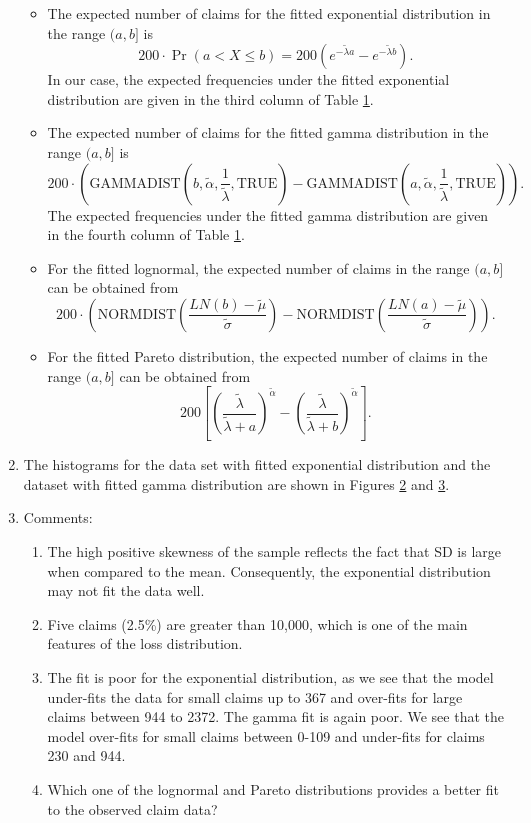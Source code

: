 \documentclass[
]{book}
\theoremstyle{definition}
\theoremstyle{definition}
\theoremstyle{definition}
\theoremstyle{definition}
\theoremstyle{remark}
\begin{document}
\begin{enumerate}
  \begin{itemize}
  \item
    The expected number of claims for the fitted exponential
    distribution in the range \((a,b]\) is
    \[200 \cdot \Pr( a < X \le b) = 200( e^{-\tilde{\lambda} a} - e^{-\tilde{\lambda} b} ).\]
    In our case, the expected frequencies under the fitted
    exponential distribution are given in the third column of Table
    \protect\hyperlink{tableFitted}{1}.
  \item
    The expected number of claims for the fitted gamma distribution
    in the range \((a,b]\) is
    \[200 \cdot\left(  \text{GAMMADIST}\left(b, \tilde{\alpha}, \frac{1}{\tilde{\lambda}}, \text{TRUE}\right)  - \text{GAMMADIST}\left(a, \tilde{\alpha}, \frac{1}{\tilde{\lambda}}, \text{TRUE}\right) \right).\]
    The expected frequencies under the fitted gamma distribution are
    given in the fourth column of Table
    \protect\hyperlink{tableFitted}{1}.
  \item
    For the fitted lognormal, the expected number of claims in the
    range \((a,b]\) can be obtained from
    \[200 \cdot\left(  \text{NORMDIST} \left(\frac{LN(b) - 
            \tilde{\mu}}{\tilde{\sigma}}\right)  - \text{NORMDIST}\left(\frac{LN(a) - 
            \tilde{\mu}}{\tilde{\sigma}}\right) \right).\]
  \item
    For the fitted Pareto distribution, the expected number of
    claims in the range \((a,b]\) can be obtained from
    \[200 \left[    \left(\frac{\tilde{\lambda}}{\tilde{\lambda} + a} \right)^{\tilde{\alpha}}  - \left(\frac{\tilde{\lambda}}{\tilde{\lambda} + b} \right)^{\tilde{\alpha}}   \right].\]
  \end{itemize}
\item
  The histograms for the data set with fitted exponential distribution
  and the dataset with fitted gamma distribution are shown in Figures
  \protect\hyperlink{FittedExpGamma}{2} and
  \protect\hyperlink{FittedLognormalPareto}{3}.
\item
  Comments:

  \begin{enumerate}
  \def\labelenumii{\arabic{enumii}.}
  \item
    The high positive skewness of the sample reflects the fact that
    SD is large when compared to the mean. Consequently, the
    exponential distribution may not fit the data well.
  \item
    Five claims (2.5\%) are greater than 10,000, which is one of the
    main features of the loss distribution.
  \item
    The fit is poor for the exponential distribution, as we see that
    the model under-fits the data for small claims up to 367 and
    over-fits for large claims between 944 to 2372. The gamma fit is
    again poor. We see that the model over-fits for small claims
    between 0-109 and under-fits for claims 230 and 944.
  \item
    Which one of the lognormal and Pareto distributions provides a
    better fit to the observed claim data?
  \end{enumerate}
\end{enumerate}
\end{document}
